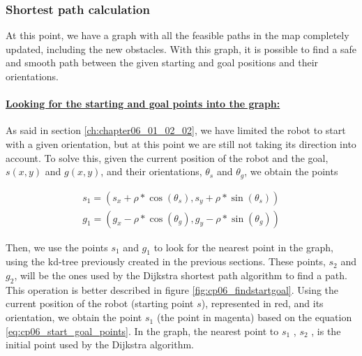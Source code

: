 \subsubsection{Shortest path calculation}\label{ch:chapter06_01_02_04}

At this point, we have a graph with all the feasible paths in the map completely updated, including the new obstacles. With this graph, it is possible to find a safe and smooth path between the given starting and goal positions and their orientations.

\paragraph{\underline{Looking for the starting and goal points into the graph:}}\label{ch:chapter06_01_02_04_01}

As said in section \ref{ch:chapter06_01_02_02}, we have limited the robot to start with a given orientation, but at this point we are still not taking its direction into account. To solve this, given the current position of the robot and the goal, $s(x,y)$ and $g(x,y)$, and their orientations, $\theta_s$ and $\theta_g$, we obtain the points

\begin{equation}\label{eq:cp06_start_goal_points}
\begin {array}{l}
 s_1 = (s_x + \rho * \cos(\theta_s), s_y + \rho * \sin(\theta_s)) \\
 g_1 = (g_x - \rho * \cos(\theta_g), g_y - \rho * \sin(\theta_g))
\end{array}
\end{equation}

Then, we use the points $s_1$ and $g_1$ to look for the nearest point in the graph, using the kd-tree previously created in the previous sections. These points, $s_2$ and $g_2$, will be the ones used by the Dijkstra shortest path algorithm to find a path. This operation is better described in figure \ref{fig:cp06_findstartgoal}. Using the current position of the robot (starting point $s$), represented in red, and its orientation, we obtain the point $s_1$ (the point in magenta) based on the equation \ref{eq:cp06_start_goal_points}. In the graph, the nearest point to $s_1$ , $s_2$ , is the initial point used by the Dijkstra algorithm.

